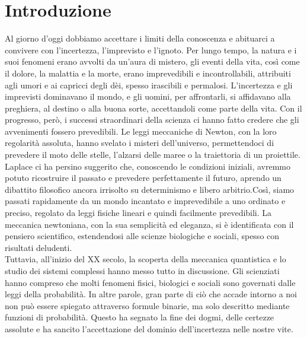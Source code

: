 \chapter{Introduzione}
\label{cap:introduzione}




Al giorno d'oggi dobbiamo accettare i limiti della conoscenza e abituarci a convivere con l'incertezza, l'imprevisto e l'ignoto. Per lungo tempo, la natura e i suoi fenomeni erano avvolti da un'aura di mistero, gli eventi della vita, così come il dolore, la malattia e la morte, erano imprevedibili e incontrollabili, attribuiti agli umori e ai capricci degli dèi, spesso irascibili e permalosi. L'incertezza e gli imprevisti dominavano il mondo, e gli uomini, per affrontarli, si affidavano alla preghiera, al destino o alla buona sorte, accettandoli come parte della vita. Con il progresso, però, i successi straordinari della scienza ci hanno fatto credere che gli avvenimenti fossero prevedibili. Le leggi meccaniche di Newton, con la loro regolarità assoluta, hanno svelato i misteri dell'universo, permettendoci di prevedere il moto delle stelle, l'alzarsi delle maree o la traiettoria di un proiettile. Laplace ci ha persino suggerito che, conoscendo le condizioni iniziali, avremmo potuto ricostruire il passato e prevedere perfettamente il futuro, aprendo un dibattito filosofico ancora irrisolto su determinismo e libero arbitrio.Così, siamo passati rapidamente da un mondo incantato e imprevedibile a uno ordinato e preciso, regolato da leggi fisiche lineari e quindi facilmente prevedibili. La meccanica newtoniana, con la sua semplicità ed eleganza, si è identificata con il pensiero scientifico, estendendosi alle scienze biologiche e sociali, spesso con risultati deludenti.\\ 

Tuttavia, all'inizio del XX secolo, la scoperta della meccanica quantistica e lo studio dei sistemi complessi hanno messo tutto in discussione. Gli scienziati hanno compreso che molti fenomeni fisici, biologici e sociali sono governati dalle leggi della probabilità. In altre parole, gran parte di ciò che accade intorno a noi non può essere spiegato attraverso formule binarie, ma solo descritto mediante funzioni di probabilità. Questo ha segnato la fine dei dogmi, delle certezze assolute e ha sancito l'accettazione del dominio dell'incertezza nelle nostre vite.\\

